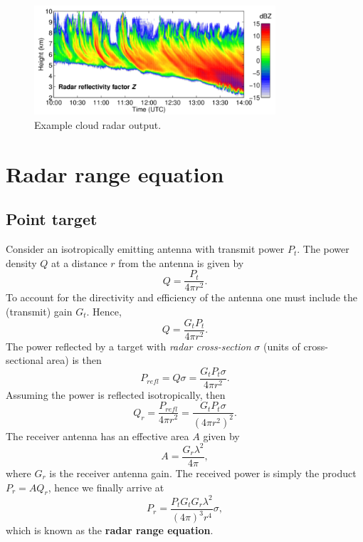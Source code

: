\documentclass{article}
\title {\mytitle}
\author{\myauthor}
\date  {\mydate}
\begin{document}
	\maketitle
	\tableofcontents
	\newpage
	
	\begin{figure}
		\centering
		\includegraphics[width=0.8\textwidth]{example-output}
		\caption{Example cloud radar output.\supercite{ExampleOutput}}
		\label{fig:ExampleOutput}
	\end{figure}
	
	\section{Radar range equation}
	
	\subsection{Point target}
	Consider an isotropically emitting antenna with transmit power \(P_t\).
	The power density \(Q\) at a distance \(r\) from the antenna is given by
	\begin{equation*}
		Q = \frac{P_t}{4 \pi r^2}.
	\end{equation*}
	To account for the directivity and efficiency of the antenna one must include the (transmit) gain \(G_t\). Hence,
	\begin{equation*}
		Q = \frac{G_t P_t}{4 \pi r^2}.
	\end{equation*}
	The power reflected by a target with \textit{radar cross-section} \(\sigma\) (units of cross-sectional area) is then
	\begin{equation*}
		P_{refl} = Q \sigma = \frac{G_t P_t \sigma}{4\pi r^2}.
	\end{equation*}
	Assuming the power is reflected isotropically, then
	\begin{equation*}
		Q_r = \frac{P_{refl}}{4\pi r^2} = \frac{G_t P_t \sigma}{(4\pi r^2)^2}.
	\end{equation*}
	The receiver antenna has an effective area \(A\) given by
	\begin{equation*}
		A = \frac{G_r \lambda^2}{4\pi},
	\end{equation*}
	where \(G_r\) is the receiver antenna gain. The received power is simply the product \(P_r = A Q_r\), hence we finally arrive at
	\begin{equation}
		P_r = \frac{P_t G_t G_r \lambda^2}{(4\pi)^3 r^4} \sigma \label{eqn:PointRange},
	\end{equation}
	which is known as the \textbf{radar range equation}.
	
\end{document}
